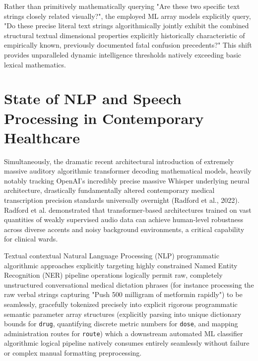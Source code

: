 \documentclass[12pt,a4paper]{report}
\begin{document}
Rather than primitively mathematically querying "Are these two specific text strings closely related visually?", the employed ML array models explicitly query, "Do these precise literal text strings algorithmically jointly exhibit the combined structural textual dimensional properties explicitly historically characteristic of empirically known, previously documented fatal confusion precedents?" This shift provides unparalleled dynamic intelligence thresholds natively exceeding basic lexical mathematics.

\section{State of NLP and Speech Processing in Contemporary Healthcare}
Simultaneously, the dramatic recent architectural introduction of extremely massive auditory algorithmic transformer decoding mathematical models, heavily notably tracking OpenAI's incredibly precise massive Whisper underlying neural architecture, drastically fundamentally altered contemporary medical transcription precision standards universally overnight (Radford et al., 2022). Radford et al. demonstrated that transformer-based architectures trained on vast quantities of weakly supervised audio data can achieve human-level robustness across diverse accents and noisy background environments, a critical capability for clinical wards.

Textual contextual Natural Language Processing (NLP) programmatic algorithmic approaches explicitly targeting highly constrained Named Entity Recognition (NER) pipeline operations logically permit raw, completely unstructured conversational medical dictation phrases (for instance processing the raw verbal strings capturing "Push 500 milligram of metformin rapidly") to be seamlessly, gracefully tokenized precisely into explicit rigorous programmatic semantic parameter array structures (explicitly parsing into unique dictionary bounds for \texttt{drug}, quantifying discrete metric numbers for \texttt{dose}, and mapping administration routes for \texttt{route}) which a downstream automated ML classifier algorithmic logical pipeline natively consumes entirely seamlessly without failure or complex manual formatting preprocessing.
\end{document}
